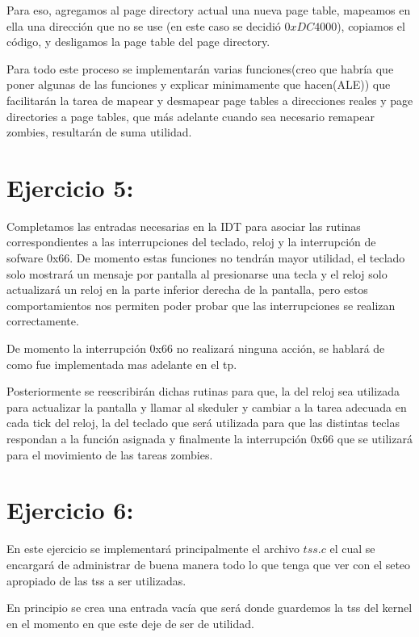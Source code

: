 \documentclass[a4paper]{article}
\begin{document}
Para eso, agregamos al page directory actual una nueva page table, mapeamos en ella una dirección que no se use (en este caso se decidió $0xDC4000$), copiamos el código, y desligamos la page table del page directory.

Para todo este proceso se implementarán varias funciones(creo que habría que poner algunas de las funciones y explicar minimamente que hacen(ALE)) que facilitarán la tarea de mapear y desmapear page tables a direcciones reales y page directories a page tables, que más adelante cuando sea necesario remapear zombies, resultarán de suma utilidad.

\section{Ejercicio 5:}
%

Completamos las entradas necesarias en la IDT para asociar las rutinas correspondientes a las interrupciones del teclado, reloj y la interrupción de sofware 0x66. De momento estas funciones no tendrán mayor utilidad, el teclado solo mostrará un mensaje por pantalla al presionarse una tecla y el reloj solo actualizará un reloj en la parte inferior derecha de la pantalla, pero estos comportamientos nos permiten poder probar que las interrupciones se realizan correctamente.

De momento la interrupción 0x66 no realizará ninguna acción, se hablará de como fue implementada mas adelante en el tp.

Posteriormente se reescribirán dichas rutinas para que, la del reloj sea utilizada para actualizar la pantalla y llamar al skeduler y cambiar a la tarea adecuada en cada tick del reloj, la del teclado que será utilizada para que las distintas teclas respondan a la función asignada y finalmente la interrupción 0x66 que se utilizará para el movimiento de las tareas zombies.

\section{Ejercicio 6:}

En este ejercicio se implementará principalmente el archivo $tss.c$ el cual se encargará de administrar de buena manera todo lo que tenga que ver con el seteo apropiado de las tss a ser utilizadas.

En principio se crea una entrada vacía que será donde guardemos la tss del kernel en el momento en que este deje de ser de utilidad.
\end{document}
